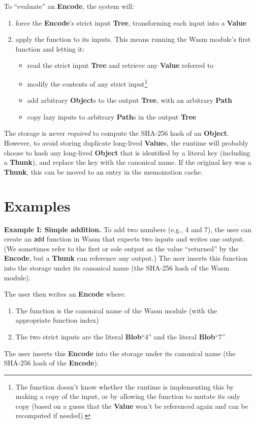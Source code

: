 \documentclass{article}
\newcommand{\blob}{\textbf{Blob}\xspace}
\newcommand{\valuex}{\textbf{Value}\xspace}
\newcommand{\valuexs}{\textbf{Value}s\xspace}
\newcommand{\object}{\textbf{Object}\xspace}
\newcommand{\objects}{\textbf{Object}s\xspace}
\newcommand{\encode}{\textbf{Encode}\xspace}
\newcommand{\thunk}{\textbf{Thunk}\xspace}
\newcommand{\tree}{\textbf{Tree}\xspace}
\newcommand{\pathx}{\textbf{Path}\xspace}
\newcommand{\pathxs}{\textbf{Path}s\xspace}
\begin{document}
To ``evaluate'' an \encode, the system will:
\begin{enumerate}[itemsep=0pt]
\item force the \encode's strict input \tree, transforming each input into a \valuex
\item apply the function to its inputs. This means running the Wasm module's first function and letting it:
\begin{itemize}[itemsep=0pt]
\item read the strict input \tree and retrieve any \valuex referred to
\item modify the contents of any strict input\footnote{The function doesn't
  know whether the runtime is implementing this by making a copy of
  the input, or by allowing the function to mutate its only copy
  (based on a guess that the \valuex won't be referenced again
  and can be recomputed if needed).}
\item add arbitrary \objects to the output \tree, with an arbitrary \pathx
\item copy lazy inputs to arbitrary \pathxs in the output \tree
\end{itemize}
\end{enumerate}

The storage is never \emph{required} to compute the SHA-256 hash of an
\object. However, to avoid storing duplicate long-lived \valuexs, the
runtime will probably choose to hash any long-lived \object that is
identified by a literal key (including a \thunk), and replace the key
with the canonical name. If the original key was a \thunk, this can be
moved to an entry in the memoization cache.

\section{Examples}

\textbf{Example I: Simple addition.} To add two numbers (e.g., 4 and
7), the user can create an \texttt{add} function in Wasm that expects
two inputs and writes one output. (We sometimes refer to the first or
sole output as the value ``returned'' by the \encode, but a \thunk can
reference any output.)  The user inserts this function into the
storage under its canonical name (the SHA-256 hash of the Wasm
module).

The user then writes an \encode where:
\begin{enumerate}[itemsep=0pt]
\item The function is the canonical name of the Wasm module (with the appropriate function index)
\item The two strict inputs are the literal \blob ``4'' and the literal \blob ``7''
\end{enumerate}
The user inserts this \encode into the storage under its canonical
name (the SHA-256 hash of the \encode).
\end{document}
